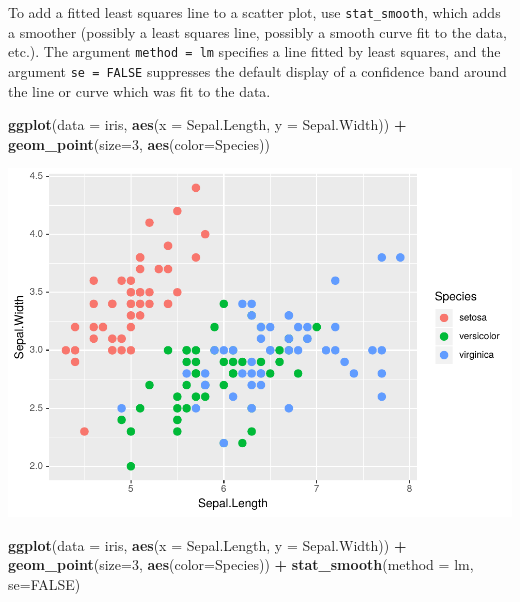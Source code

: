 \documentclass[
]{krantz}
\makeatletter
\newenvironment{Shaded}{\begin{snugshade}}{\end{snugshade}}
\newcommand{\DataTypeTok}[1]{\textcolor[rgb]{0.27,0.27,0.27}{#1}}
\newcommand{\DecValTok}[1]{\textcolor[rgb]{0.06,0.06,0.06}{#1}}
\newcommand{\KeywordTok}[1]{\textcolor[rgb]{0.27,0.27,0.27}{\textbf{#1}}}
\newcommand{\NormalTok}[1]{#1}
\newcommand{\OperatorTok}[1]{\textcolor[rgb]{0.43,0.43,0.43}{\textbf{#1}}}
\newcommand{\OtherTok}[1]{\textcolor[rgb]{0.37,0.37,0.37}{#1}}
\newcommand{\StringTok}[1]{\textcolor[rgb]{0.5,0.5,0.5}{#1}}
\newenvironment{kframe}{%
\medskip{}
\setlength{\fboxsep}{.8em}
 \def\at@end@of@kframe{}%
 \ifinner\ifhmode%
  \def\at@end@of@kframe{\end{minipage}}%
  \begin{minipage}{\columnwidth}%
 \fi\fi%
 \def\FrameCommand##1{\hskip\@totalleftmargin \hskip-\fboxsep
 \colorbox{shadecolor}{##1}\hskip-\fboxsep
     \hskip-\linewidth \hskip-\@totalleftmargin \hskip\columnwidth}%
 \MakeFramed {\advance\hsize-\width
   \@totalleftmargin\z@ \linewidth\hsize
   \@setminipage}}%
 {\par\unskip\endMakeFramed%
 \at@end@of@kframe}
\renewenvironment{Shaded}{\begin{kframe}}{\end{kframe}}
\makeatother
\begin{document}
To add a fitted least squares line to a scatter plot, use \texttt{stat\_smooth}, which adds a smoother (possibly a least squares line, possibly a smooth curve fit to the data, etc.). The argument \texttt{method\ =\ lm} specifies a line fitted by least squares, and the argument \texttt{se\ =\ FALSE} suppresses the default display of a confidence band around the line or curve which was fit to the data.

\begin{Shaded}
\begin{Highlighting}[]
\KeywordTok{ggplot}\NormalTok{(}\DataTypeTok{data =}\NormalTok{ iris, }\KeywordTok{aes}\NormalTok{(}\DataTypeTok{x =}\NormalTok{ Sepal.Length, }\DataTypeTok{y =}\NormalTok{ Sepal.Width)) }\OperatorTok{+}\StringTok{ }
\StringTok{    }\KeywordTok{geom\_point}\NormalTok{(}\DataTypeTok{size=}\DecValTok{3}\NormalTok{, }\KeywordTok{aes}\NormalTok{(}\DataTypeTok{color=}\NormalTok{Species))}
\end{Highlighting}
\end{Shaded}

\includegraphics{bookdown_files/figure-latex/unnamed-chunk-62-1.pdf}

\begin{Shaded}
\begin{Highlighting}[]
\KeywordTok{ggplot}\NormalTok{(}\DataTypeTok{data =}\NormalTok{ iris, }\KeywordTok{aes}\NormalTok{(}\DataTypeTok{x =}\NormalTok{ Sepal.Length, }\DataTypeTok{y =}\NormalTok{ Sepal.Width)) }\OperatorTok{+}\StringTok{ }
\StringTok{    }\KeywordTok{geom\_point}\NormalTok{(}\DataTypeTok{size=}\DecValTok{3}\NormalTok{, }\KeywordTok{aes}\NormalTok{(}\DataTypeTok{color=}\NormalTok{Species)) }\OperatorTok{+}\StringTok{ }
\StringTok{    }\KeywordTok{stat\_smooth}\NormalTok{(}\DataTypeTok{method =}\NormalTok{ lm, }\DataTypeTok{se=}\OtherTok{FALSE}\NormalTok{)}
\end{Highlighting}
\end{Shaded}
\end{document}
